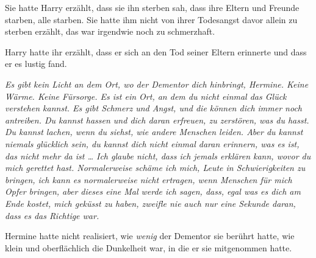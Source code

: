 Sie hatte Harry erzählt, dass sie ihn sterben sah, dass ihre Eltern und Freunde starben, alle starben. Sie hatte ihm nicht von ihrer Todesangst davor allein zu sterben erzählt, das war irgendwie noch zu schmerzhaft.

Harry hatte ihr erzählt, dass er sich an den Tod seiner Eltern erinnerte und dass er es lustig fand.

\emph{Es gibt kein Licht an dem Ort, wo der Dementor dich hinbringt, Hermine. Keine Wärme. Keine Fürsorge. Es ist ein Ort, an dem du nicht einmal das Glück verstehen kannst. Es gibt Schmerz und Angst, und die können dich immer noch antreiben. Du kannst hassen und dich daran erfreuen, zu zerstören, was du hasst. Du kannst lachen, wenn du siehst, wie andere Menschen leiden. Aber du kannst niemals glücklich sein, du kannst dich nicht einmal daran erinnern, was es ist, das nicht mehr da ist … Ich glaube nicht, dass ich jemals erklären kann, wovor du mich gerettet hast. Normalerweise schäme ich mich, Leute in Schwierigkeiten zu bringen, ich kann es normalerweise nicht ertragen, wenn Menschen für mich Opfer bringen, aber dieses eine Mal werde ich sagen, dass, egal was es dich am Ende kostet, mich geküsst zu haben, zweifle nie auch nur eine Sekunde daran, dass es das Richtige war.}

Hermine hatte nicht realisiert, wie \emph{wenig} der Dementor sie berührt hatte, wie klein und oberflächlich die Dunkelheit war, in die er sie mitgenommen hatte.

